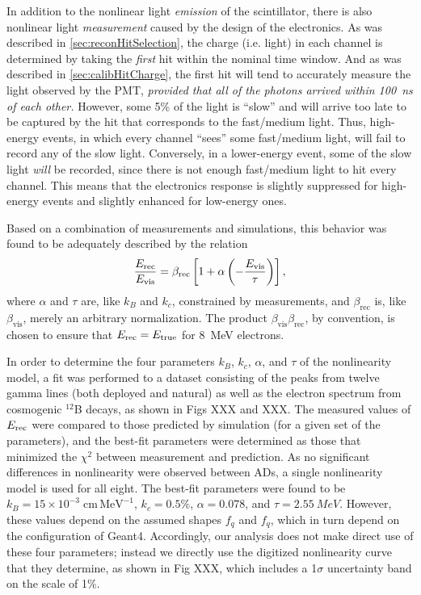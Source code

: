 \documentclass[../thesis.tex]{subfiles}
\begin{document}
In addition to the nonlinear light \emph{emission} of the scintillator, there is also nonlinear light \emph{measurement} caused by the design of the electronics. As was described in \autoref{sec:reconHitSelection}, the charge (i.e. light) in each channel is determined by taking the \emph{first} hit within the nominal time window. And as was described in \autoref{sec:calibHitCharge}, the first hit will tend to accurately measure the light observed by the PMT, \emph{provided that all of the photons arrived within 100~ns of each other.} However, some 5\% of the light is ``slow'' and will arrive too late to be captured by the hit that corresponds to the fast/medium light. Thus, high-energy events, in which every channel ``sees'' some fast/medium light, will fail to record any of the slow light. Conversely, in a lower-energy event, some of the slow light \emph{will} be recorded, since there is not enough fast/medium light to hit every channel. This means that the electronics response is slightly suppressed for high-energy events and slightly enhanced for low-energy ones.

Based on a combination of measurements and simulations, this behavior was found to be adequately described by the relation
\begin{equation*}
  \frac{E_\mathrm{rec}}{E_\mathrm{vis}} = \beta_{\mathrm{rec}}\left[ 1 + \alpha \left( - \frac{E_\mathrm{vis}}{\tau} \right) \right],
\end{equation*}
where $\alpha$ and $\tau$ are, like $k_B$ and $k_c$, constrained by measurements, and $\beta_{\mathrm{rec}}$ is, like $\beta_{\mathrm{vis}}$, merely an arbitrary normalization. The product $\beta_{\mathrm{vis}}\beta_{\mathrm{rec}}$, by convention, is chosen to ensure that $E_\mathrm{rec} = E_\mathrm{true}$ for 8~MeV electrons.

In order to determine the four parameters $k_B$, $k_c$, $\alpha$, and $\tau$ of the nonlinearity model, a fit was performed to a dataset consisting of the peaks from twelve gamma lines (both deployed and natural) as well as the electron spectrum from cosmogenic $^{12}$B decays, as shown in Figs XXX and XXX. The measured values of $E_\mathrm{rec}$ were compared to those predicted by simulation (for a given set of the parameters), and the best-fit parameters were determined as those that minimized the $\chi^2$ between measurement and prediction. As no significant differences in nonlinearity were observed between ADs, a single nonlinearity model is used for all eight. The best-fit parameters were found to be $k_B = 15 \times 10^{-3}\;\mathrm{cm\, MeV^{-1}}$, $k_c = 0.5\%$, $\alpha = 0.078$, and $\tau = \SI{2.55}{MeV}$. However, these values depend on the assumed shapes $f_q$ and $f_q$, which in turn depend on the configuration of Geant4. Accordingly, our analysis does not make direct use of these four parameters; instead we directly use the digitized nonlinearity curve that they determine, as shown in Fig XXX, which includes a 1$\sigma$ uncertainty band on the scale of 1\%.
\end{document}

